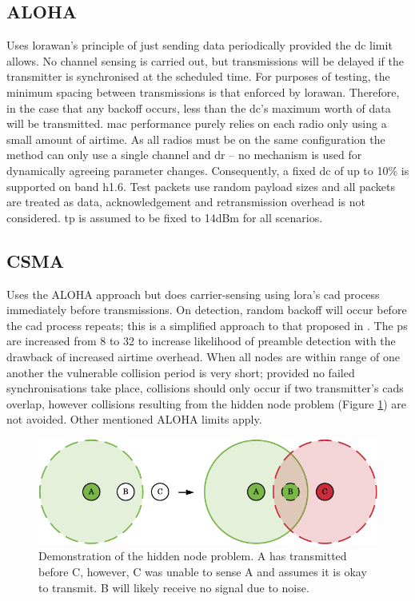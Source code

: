 \subsection{ALOHA}
Uses \ac{lorawan}'s principle of just sending data periodically provided the \ac{dc} limit allows. No channel sensing is carried out, but transmissions will be delayed if the transmitter is synchronised at the scheduled time. For purposes of testing, the minimum spacing between transmissions is that enforced by \ac{lorawan}. Therefore, in the case that any backoff occurs, less than the \ac{dc}'s maximum worth of data will be transmitted. \ac{mac} performance purely relies on each radio only using a small amount of airtime. As all radios must be on the same configuration the method can only use a single channel and \ac{dr} -- no mechanism is used for dynamically agreeing parameter changes. Consequently, a fixed \ac{dc} of up to 10\% is supported on band h1.6. Test packets use random payload sizes and all packets are treated as data, acknowledgement and retransmission overhead is not considered. \ac{tp} is assumed to be fixed to 14dBm for all scenarios.

\subsection{CSMA}
Uses the ALOHA approach but does carrier-sensing using \ac{lora}'s \ac{cad} process immediately before transmissions. On detection, random backoff will occur before the \ac{cad} process repeats; this is a simplified approach to that proposed in \cite{3YP:LORA_CSMA}. The \ac{ps} are increased from 8 to 32 to increase likelihood of preamble detection with the drawback of increased airtime overhead. When all nodes are within range of one another the vulnerable collision period is very short; provided no failed synchronisations take place, collisions should only occur if two transmitter's \ac{cad}s overlap, however collisions resulting from the hidden node problem (Figure \ref{fig:hidden_node_problem}) are not avoided. Other mentioned ALOHA limits apply.

\begin{figure}[H]
    \centering
   	\includegraphics{Figures/hidden_node_problem}
    \caption[Demonstration of hidden node problem]{
    	Demonstration of the hidden node problem. A has transmitted before C, however, C was unable to sense A and assumes it is okay to transmit. B will likely receive no signal due to noise.
    }
    \label{fig:hidden_node_problem}
\end{figure}


